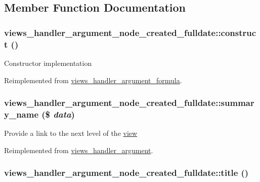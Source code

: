 \subsection{Member Function Documentation}
\hypertarget{classviews__handler__argument__node__created__fulldate_f5b74c0204c9da9285cbe3e07ebed345}{
\subsubsection[{construct}]{\setlength{\rightskip}{0pt plus 5cm}views\_\-handler\_\-argument\_\-node\_\-created\_\-fulldate::construct ()}}
\label{classviews__handler__argument__node__created__fulldate_f5b74c0204c9da9285cbe3e07ebed345}


Constructor implementation 

Reimplemented from \hyperlink{classviews__handler__argument__formula_01284402427de2bcfa1b1da5792a2332}{views\_\-handler\_\-argument\_\-formula}.\hypertarget{classviews__handler__argument__node__created__fulldate_b3d201e95c5307b166a85add6cfdebe2}{
\subsubsection[{summary\_\-name}]{\setlength{\rightskip}{0pt plus 5cm}views\_\-handler\_\-argument\_\-node\_\-created\_\-fulldate::summary\_\-name (\$ {\em data})}}
\label{classviews__handler__argument__node__created__fulldate_b3d201e95c5307b166a85add6cfdebe2}


Provide a link to the next level of the \hyperlink{classview}{view} 

Reimplemented from \hyperlink{classviews__handler__argument_4c55a340453eed4d35c69f7ac790cac1}{views\_\-handler\_\-argument}.\hypertarget{classviews__handler__argument__node__created__fulldate_7e071511e9b2523b875b4ba983bbb8f2}{
\subsubsection[{title}]{\setlength{\rightskip}{0pt plus 5cm}views\_\-handler\_\-argument\_\-node\_\-created\_\-fulldate::title ()}}
\label{classviews__handler__argument__node__created__fulldate_7e071511e9b2523b875b4ba983bbb8f2}


